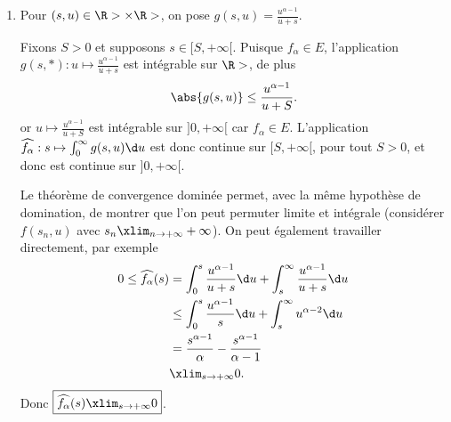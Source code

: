 \begin{enonce}
\begin{solution}
\begin{enumerate}
En conclusion $f_\alpha\in E$ si et seulement si $0<\alpha<1$.

\item
Pour $(s,u)\in \R>\times\R>$, on pose $g(s,u)=\frac{u^{\alpha-1}}{u+s}$.

Fixons $S>0$ et supposons $s\in[S,+\infty[$.
Puisque $f_\alpha\in E$, l'application $g(s,*):u\mapsto \frac{u^{\alpha-1}}{u+s}$ est intégrable sur $\R>$, de plus
\begin{equation*}
\abs{g(s,u)}\le \frac{u^{\alpha-1}}{u+S}.
\end{equation*}
or $u\mapsto\frac{u^{\alpha-1}}{u+S}$ est intégrable sur $]0,+\infty[$ car $f_\alpha\in E$. L'application $\widehat{f_\alpha}:s\mapsto \int_0^\infty g(s,u)\d u$ est donc continue sur $[S,+\infty[$, pour tout $S>0$, et donc est continue sur $]0,+\infty[$.

Le théorème de convergence dominée permet, avec la même hypothèse de domination, de montrer que l'on peut permuter limite et intégrale (considérer $f(s_n,u)$ avec $s_n\xlim_{n\to+\infty} +\infty$). On peut également travailler directement, par exemple
\begin{align*}
0\le \widehat{f_\alpha}(s)
    &=\int_0^s \frac{u^{\alpha-1}}{u+s}\d u + \int_s^\infty\frac{u^{\alpha-1}}{u+s}\d u \\
    &\le \int_0^s \frac{u^{\alpha-1}}{s}\d u +\int_s^\infty u^{\alpha-2}\d u\\
    &= \frac{s^{\alpha-1}}{\alpha} - \frac{s^{\alpha-1}}{\alpha-1}\\
    &\xlim_{s\to+\infty} 0.
\end{align*}
Donc $\boxed{\widehat{f_\alpha}(s)\xlim_{s\to+\infty} 0}$.

\end{enumerate}
\end{solution}
\end{enonce}
